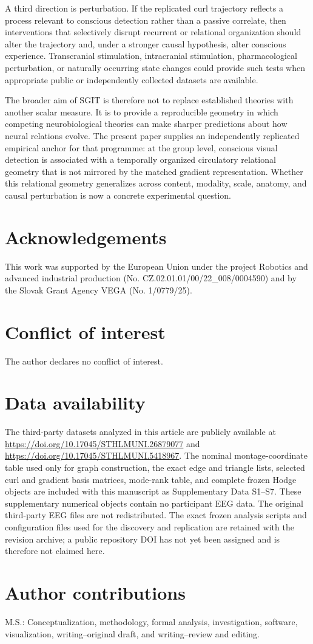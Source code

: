 \documentclass[12pt]{article}
\begin{document}
A third direction is perturbation. If the replicated curl trajectory reflects a process relevant to conscious detection rather than a passive correlate, then interventions that selectively disrupt recurrent or relational organization should alter the trajectory and, under a stronger causal hypothesis, alter conscious experience. Transcranial stimulation, intracranial stimulation, pharmacological perturbation, or naturally occurring state changes could provide such tests when appropriate public or independently collected datasets are available.

The broader aim of SGIT is therefore not to replace established theories with another scalar measure. It is to provide a reproducible geometry in which competing neurobiological theories can make sharper predictions about how neural relations evolve. The present paper supplies an independently replicated empirical anchor for that programme: at the group level, conscious visual detection is associated with a temporally organized circulatory relational geometry that is not mirrored by the matched gradient representation. Whether this relational geometry generalizes across content, modality, scale, anatomy, and causal perturbation is now a concrete experimental question.

\section*{Acknowledgements}
This work was supported by the European Union under the project Robotics and advanced industrial production (No. CZ.02.01.01/00/22\_008/0004590) and by the Slovak Grant Agency VEGA (No. 1/0779/25).

\section*{Conflict of interest}
The author declares no conflict of interest.

\section*{Data availability}
The third-party datasets analyzed in this article are publicly available at \url{https://doi.org/10.17045/STHLMUNI.26879077} and \url{https://doi.org/10.17045/STHLMUNI.5418967}. The nominal montage-coordinate table used only for graph construction, the exact edge and triangle lists, selected curl and gradient basis matrices, mode-rank table, and complete frozen Hodge objects are included with this manuscript as Supplementary Data S1--S7. These supplementary numerical objects contain no participant EEG data. The original third-party EEG files are not redistributed. The exact frozen analysis scripts and configuration files used for the discovery and replication are retained with the revision archive; a public repository DOI has not yet been assigned and is therefore not claimed here.

\section*{Author contributions}
M.S.: Conceptualization, methodology, formal analysis, investigation, software, visualization, writing--original draft, and writing--review and editing.



\end{document}
